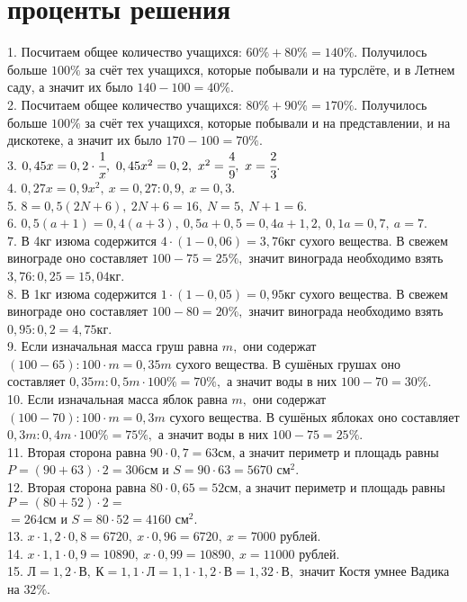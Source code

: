 \section{проценты решения}
1. Посчитаем общее количество учащихся: $60\%+80\%=140\%.$ Получилось больше $100\%$ за счёт тех учащихся, которые побывали и на турслёте, и в Летнем саду, а значит их было $140-100=40\%.$\\
2. Посчитаем общее количество учащихся: $80\%+90\%=170\%.$ Получилось больше $100\%$ за счёт тех учащихся, которые побывали и на представлении, и на дискотеке, а значит их было $170-100=70\%.$\\
3. $0,45x=0,2\cdot\cfrac{1}{x},\ 0,45x^2=0,2,\ x^2=\cfrac{4}{9},\ x=\cfrac{2}{3}.$\\
4. $0,27x=0,9x^2,\ x=0,27:0,9,\ x=0,3.$\\
5. $8=0,5(2N+6),\ 2N+6=16,\ N=5,\ N+1=6.$\\
6. $0,5(a+1)=0,4(a+3),\ 0,5a+0,5=0,4a+1,2,\ 0,1a=0,7,\ a=7.$\\
7. В 4кг изюма содержится $4\cdot(1-0,06)=3,76$кг сухого вещества. В свежем винограде оно составляет $100-75=25\%,$ значит винограда необходимо взять $3,76:0,25=15,04$кг.\\
8. В 1кг изюма содержится $1\cdot(1-0,05)=0,95$кг сухого вещества. В свежем винограде оно составляет $100-80=20\%,$ значит винограда необходимо взять $0,95:0,2=4,75$кг.\\
9. Если изначальная масса груш равна $m,$ они содержат $(100-65):100\cdot m=0,35m$ сухого вещества. В сушёных грушах оно составляет $0,35m:0,5m\cdot100\%=70\%,$ а значит воды в них $100-70=30\%.$\\
10. Если изначальная масса яблок равна $m,$ они содержат $(100-70):100\cdot m=0,3m$ сухого вещества. В сушёных яблоках оно составляет $0,3m:0,4m\cdot100\%=75\%,$ а значит воды в них $100-75=25\%.$\\
11. Вторая сторона равна $90\cdot0,7=63$см, а значит периметр и площадь равны $P=(90+63)\cdot2=306$см и $S=90\cdot63=5670\text{ см}^2.$\\
12. Вторая сторона равна $80\cdot0,65=52$см, а значит периметр и площадь равны $P=(80+52)\cdot2=$\\$=264$см и $S=80\cdot52=4160\text{ см}^2.$\\
13. $x\cdot1,2\cdot0,8=6720,\ x\cdot0,96=6720,\ x=7000$ рублей.\\
14. $x\cdot1,1\cdot0,9=10890,\ x\cdot0,99=10890,\ x=11000$ рублей.\\
15. $\text{Л}=1,2\cdot\text{В},\ \text{К}=1,1\cdot\text{Л}=1,1\cdot1,2\cdot\text{В}=1,32\cdot\text{В},$ значит Костя умнее Вадика на $32\%.$\\
